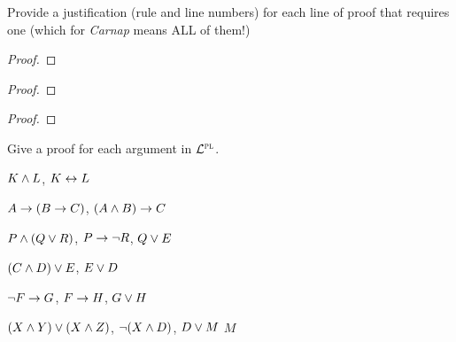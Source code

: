  
\clearpage



\practiceproblems

\solutions
\problempart
\label{pr.justifyPLproof}
Provide a justification (rule and line numbers) for each line of proof that requires one {\color{black}(which for \textit{Carnap} means ALL of them!)}
\begin{multicols}{2}
\begin{proof}
 {}
 {}
\end{proof}

\begin{proof}
\open
\close
{}
\end{proof}

\begin{proof}
\open
	 {}
	\open
	\close
\close
{}
\end{proof}
\end{multicols}

\solutions
\problempart
\label{pr.solvedPLproofs}
Give a proof for each argument in $\mathcal{L}^{\textsc{pl}}$.
\begin{earg}
\item $K\wedge L$, \therefore $K\leftrightarrow L$
\item $A\rightarrow (B\rightarrow C)$, \therefore $(A\wedge B)\rightarrow C$
\item $P \wedge (Q\vee R)$, $P\rightarrow \neg R$, \therefore $Q\vee E$
\item $(C\wedge D)\vee E$, \therefore $E\vee D$
\item $\neg F\rightarrow G$, $F\rightarrow H$, \therefore $G\vee H$
\item $(X\wedge Y)\vee(X\wedge Z)$, $\neg(X\wedge D)$, $D\vee M$ \therefore $M$
\end{earg}

